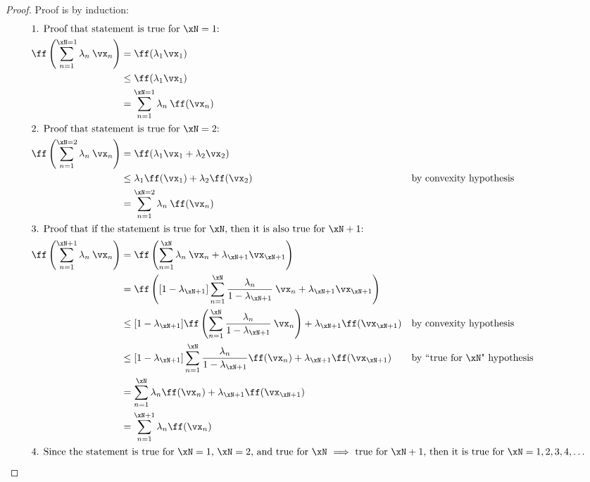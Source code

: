 \begin{proof}
Proof is by induction:
\begin{align*}
  \intertext{1. Proof that statement is true for $\xN=1$:} 
    \ff\left(\sum_{n=1}^{\xN=1} \lambda_n \: \vx_n\right) 
      &=   \ff(\lambda_1 \vx_1) 
    \\&\le \ff(\lambda_1 \vx_1) 
    \\&=   \sum_{n=1}^{\xN=1} \lambda_n\:\ff(\vx_n)
    \\
  \intertext{2. Proof that statement is true for $\xN=2$:} 
    \ff\left(\sum_{n=1}^{\xN=2} \lambda_n \: \vx_n\right) 
      &=   \ff(\lambda_1 \vx_1 + \lambda_2\vx_2) 
    \\&\le \lambda_1 \ff(\vx_1) + \lambda_2 \ff(\vx_2)
      &&   \text{by convexity hypothesis}
    \\&=   \sum_{n=1}^{\xN=2} \lambda_n\:\ff(\vx_n)
    \\
  \intertext{3. Proof that if the statement is true for $\xN$, then it is also true for $\xN+1$:} 
    \ff\left(\sum_{n=1}^{\xN+1} \lambda_n \: \vx_n\right) 
      &=   \ff\left(\sum_{n=1}^{\xN} \lambda_n \: \vx_n + \lambda_{\xN+1}\vx_{\xN+1}\right) 
    \\&=   \ff\left([1-\lambda_{\xN+1}]\sum_{n=1}^{\xN} \frac{\lambda_n}{1-\lambda_{\xN+1}} \: \vx_n + \lambda_{\xN+1}\vx_{\xN+1}\right) 
    \\&\le [1-\lambda_{\xN+1}]\ff\left(\sum_{n=1}^{\xN} \frac{\lambda_n}{1-\lambda_{\xN+1}} \: \vx_n \right) 
         + \lambda_{\xN+1}\ff(\vx_{\xN+1}) 
      &&   \text{by convexity hypothesis}
    \\&\le [1-\lambda_{\xN+1}]\sum_{n=1}^{\xN} \frac{\lambda_n}{1-\lambda_{\xN+1}}\ff(\vx_n) 
         + \lambda_{\xN+1}\ff(\vx_{\xN+1}) 
      &&   \text{by ``true for $\xN$" hypothesis}
    \\&=   \sum_{n=1}^{\xN} \lambda_n \ff(\vx_n) + \lambda_{\xN+1}\ff(\vx_{\xN+1}) 
    \\&=   \sum_{n=1}^{\xN+1} \lambda_n \ff(\vx_n)
    \\
  \intertext{4. Since the statement is true for $\xN=1$, $\xN=2$, and 
                true for $\xN$ $\implies$ true for $\xN+1$,
                then it is true for $\xN=1,2,3,4,\ldots$}
\end{align*}
\end{proof}


